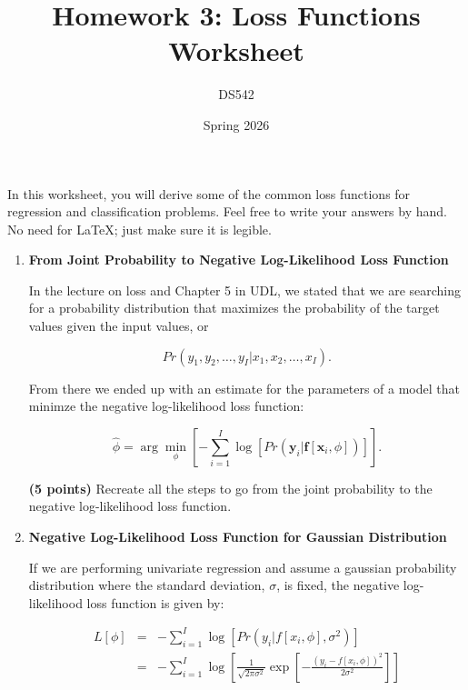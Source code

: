 \documentclass[11pt]{article}
\title{Homework 3: Loss Functions Worksheet}
\date{Spring 2026}
\author{DS542}
\begin{document}
\maketitle

\noindent
In this worksheet, you will derive some of the common loss functions for regression and classification problems.
Feel free to write your answers by hand.
No need for LaTeX; just make sure it is legible.

\begin{enumerate}

\item \textbf{From Joint Probability to Negative Log-Likelihood Loss Function}

In the lecture on loss and Chapter 5 in UDL, we stated that we are searching for a 
probability distribution that maximizes the probability of the target values
given the input values, or

\begin{equation*}
  Pr(y_1, y_2, \ldots, y_I | x_1, x_2, \ldots, x_I).
\end{equation*}

From there we ended up with an estimate for the parameters of a model that minimze
the negative log-likelihood loss function:

\begin{equation*}
  \hat{\phi} = 
  \arg\min_{\phi} \left[ - \sum_{i=1}^I \log \left[ Pr(\mathbf{y}_i | \mathbf{f}[\mathbf{x}_i, \phi]) \right] \right].
\end{equation*}

\textbf{(5 points)} Recreate all the steps to go from the joint probability to the negative log-likelihood loss function.

\newpage

\vphantom{X}
\thispagestyle{plain}


\newpage

\item \textbf{Negative Log-Likelihood Loss Function for Gaussian Distribution}

If we are performing univariate regression and assume a gaussian probability distribution
where the standard deviation, $\sigma$, is fixed, the negative log-likelihood
loss function is given by:


\begin{eqnarray*}
  L[\phi] & = & - \sum_{i=1}^{I} \log \left[ Pr \left(y_i | f[x_i,\phi], \sigma^2 \right) \right] \\
  & = & - \sum_{i=1}^{I} \log \left[ \frac{1}{\sqrt{2\pi \sigma^2}} \exp \left[ - \frac{(y_i - f[x_i,\phi])^2}{2\sigma^2} \right] \right]
\end{eqnarray*}


\end{enumerate}
\end{document}
